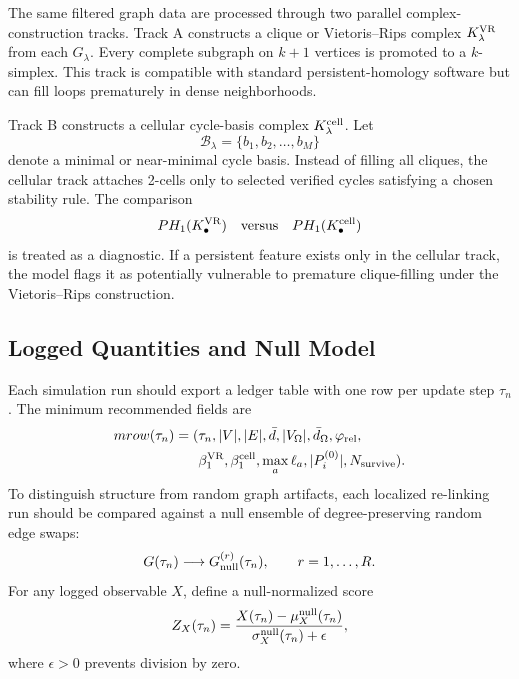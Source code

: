 \documentclass[11pt]{article}
\newcommand{\Pre}{P_i^{(0)}}
\begin{document}
The same filtered graph data are processed through two parallel complex-construction tracks. Track A constructs a clique or Vietoris--Rips complex \(K_\lambda^{\rm VR}\) from each \(G_\lambda\). Every complete subgraph on \(k+1\) vertices is promoted to a \(k\)-simplex. This track is compatible with standard persistent-homology software but can fill loops prematurely in dense neighborhoods.

Track B constructs a cellular cycle-basis complex \(K_\lambda^{\rm cell}\). Let
\begin{equation}
    \mathcal B_\lambda=\{b_1,b_2,\ldots,b_M\}
\end{equation}
denote a minimal or near-minimal cycle basis. Instead of filling all cliques, the cellular track attaches 2-cells only to selected verified cycles satisfying a chosen stability rule. The comparison
\begin{equation}
    PH_1(K_\bullet^{\rm VR})
    \quad\text{versus}\quad
    PH_1(K_\bullet^{\rm cell})
\end{equation}
is treated as a diagnostic. If a persistent feature exists only in the cellular track, the model flags it as potentially vulnerable to premature clique-filling under the Vietoris--Rips construction.

\subsection{Logged Quantities and Null Model}

Each simulation run should export a ledger table with one row per update step \(\tau_n\). The minimum recommended fields are
\begin{equation}
\begin{aligned}
{
m row}(\tau_n)=(&\tau_n,|V|,|E|,\bar d,|V_\Omega|,\bar d_\Omega,
\varphi_{\rm rel},\\
&\beta_1^{\rm VR},\beta_1^{\rm cell},\max_a\ell_a,
|\Pre|,N_{\rm survive}).
\end{aligned}
\end{equation}
To distinguish structure from random graph artifacts, each localized re-linking run should be compared against a null ensemble of degree-preserving random edge swaps:
\begin{equation}
    G(\tau_n)\longrightarrow G_{\rm null}^{(r)}(\tau_n),
    \qquad r=1,\ldots,R.
\end{equation}
For any logged observable \(X\), define a null-normalized score
\begin{equation}
    Z_X(\tau_n)=\frac{X(\tau_n)-\mu_X^{\rm null}(\tau_n)}{\sigma_X^{\rm null}(\tau_n)+\epsilon},
\end{equation}
where \(\epsilon>0\) prevents division by zero.
\end{document}
